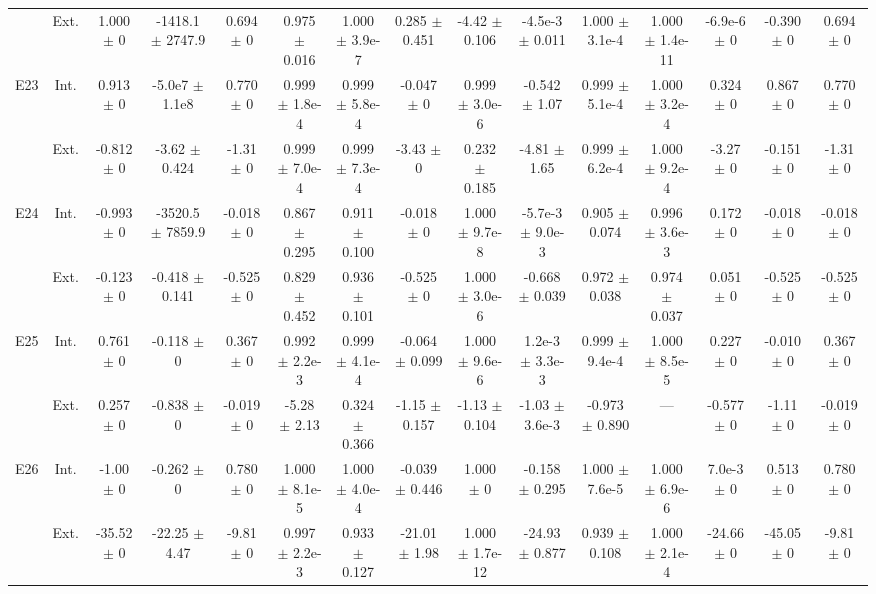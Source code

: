 \begin{table}[htbp]
{\begin{tabular}{@{}ccccccccccccccc@{}}
 & Ext. & 1.000 $\pm$ 0 & -1418.1 $\pm$ 2747.9 & 0.694 $\pm$ 0 & 0.975 $\pm$ 0.016 & 1.000 $\pm$ 3.9e-7 & 0.285 $\pm$ 0.451 & -4.42 $\pm$ 0.106 & -4.5e-3 $\pm$ 0.011 & 1.000 $\pm$ 3.1e-4 & 1.000 $\pm$ 1.4e-11 & -6.9e-6 $\pm$ 0 & -0.390 $\pm$ 0 & 0.694 $\pm$ 0 \\
\cline{2-15}
\multirow{2}{*}{E23} & Int. & 0.913 $\pm$ 0 & -5.0e7 $\pm$ 1.1e8 & 0.770 $\pm$ 0 & 0.999 $\pm$ 1.8e-4 & 0.999 $\pm$ 5.8e-4 & -0.047 $\pm$ 0 & 0.999 $\pm$ 3.0e-6 & -0.542 $\pm$ 1.07 & 0.999 $\pm$ 5.1e-4 & 1.000 $\pm$ 3.2e-4 & 0.324 $\pm$ 0 & 0.867 $\pm$ 0 & 0.770 $\pm$ 0 \\
 & Ext. & -0.812 $\pm$ 0 & -3.62 $\pm$ 0.424 & -1.31 $\pm$ 0 & 0.999 $\pm$ 7.0e-4 & 0.999 $\pm$ 7.3e-4 & -3.43 $\pm$ 0 & 0.232 $\pm$ 0.185 & -4.81 $\pm$ 1.65 & 0.999 $\pm$ 6.2e-4 & 1.000 $\pm$ 9.2e-4 & -3.27 $\pm$ 0 & -0.151 $\pm$ 0 & -1.31 $\pm$ 0 \\
\cline{2-15}
\multirow{2}{*}{E24} & Int. & -0.993 $\pm$ 0 & -3520.5 $\pm$ 7859.9 & -0.018 $\pm$ 0 & 0.867 $\pm$ 0.295 & 0.911 $\pm$ 0.100 & -0.018 $\pm$ 0 & 1.000 $\pm$ 9.7e-8 & -5.7e-3 $\pm$ 9.0e-3 & 0.905 $\pm$ 0.074 & 0.996 $\pm$ 3.6e-3 & 0.172 $\pm$ 0 & -0.018 $\pm$ 0 & -0.018 $\pm$ 0 \\
 & Ext. & -0.123 $\pm$ 0 & -0.418 $\pm$ 0.141 & -0.525 $\pm$ 0 & 0.829 $\pm$ 0.452 & 0.936 $\pm$ 0.101 & -0.525 $\pm$ 0 & 1.000 $\pm$ 3.0e-6 & -0.668 $\pm$ 0.039 & 0.972 $\pm$ 0.038 & 0.974 $\pm$ 0.037 & 0.051 $\pm$ 0 & -0.525 $\pm$ 0 & -0.525 $\pm$ 0 \\
\cline{2-15}
\multirow{2}{*}{E25} & Int. & 0.761 $\pm$ 0 & -0.118 $\pm$ 0 & 0.367 $\pm$ 0 & 0.992 $\pm$ 2.2e-3 & 0.999 $\pm$ 4.1e-4 & -0.064 $\pm$ 0.099 & 1.000 $\pm$ 9.6e-6 & 1.2e-3 $\pm$ 3.3e-3 & 0.999 $\pm$ 9.4e-4 & 1.000 $\pm$ 8.5e-5 & 0.227 $\pm$ 0 & -0.010 $\pm$ 0 & 0.367 $\pm$ 0 \\
 & Ext. & 0.257 $\pm$ 0 & -0.838 $\pm$ 0 & -0.019 $\pm$ 0 & -5.28 $\pm$ 2.13 & 0.324 $\pm$ 0.366 & -1.15 $\pm$ 0.157 & -1.13 $\pm$ 0.104 & -1.03 $\pm$ 3.6e-3 & -0.973 $\pm$ 0.890 & --- & -0.577 $\pm$ 0 & -1.11 $\pm$ 0 & -0.019 $\pm$ 0 \\
\cline{2-15}
\multirow{2}{*}{E26} & Int. & -1.00 $\pm$ 0 & -0.262 $\pm$ 0 & 0.780 $\pm$ 0 & 1.000 $\pm$ 8.1e-5 & 1.000 $\pm$ 4.0e-4 & -0.039 $\pm$ 0.446 & 1.000 $\pm$ 0 & -0.158 $\pm$ 0.295 & 1.000 $\pm$ 7.6e-5 & 1.000 $\pm$ 6.9e-6 & 7.0e-3 $\pm$ 0 & 0.513 $\pm$ 0 & 0.780 $\pm$ 0 \\
 & Ext. & -35.52 $\pm$ 0 & -22.25 $\pm$ 4.47 & -9.81 $\pm$ 0 & 0.997 $\pm$ 2.2e-3 & 0.933 $\pm$ 0.127 & -21.01 $\pm$ 1.98 & 1.000 $\pm$ 1.7e-12 & -24.93 $\pm$ 0.877 & 0.939 $\pm$ 0.108 & 1.000 $\pm$ 2.1e-4 & -24.66 $\pm$ 0 & -45.05 $\pm$ 0 & -9.81 $\pm$ 0 \\

\end{tabular}}
\end{table}
